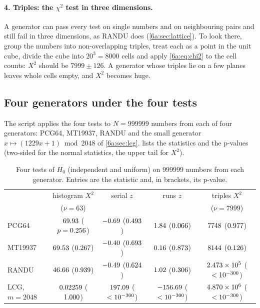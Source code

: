 \paragraph{4. Triples: the $\chi^2$ test in three dimensions.}
A generator can pass every test on single numbers and on neighbouring pairs and
still fail in three dimensions, as RANDU does (\cref{6a:sec:lattice}). To look
there, group the numbers into non-overlapping triples, treat each as a point in
the unit cube, divide the cube into $20^3=8000$ cells and apply \eqref{6a:eq:chi2} to the
cell counts: $X^2$ should be $7999\pm126$. A generator whose triples lie on a few
planes leaves whole cells empty, and $X^2$ becomes huge.

\subsection{Four generators under the four tests}

The script  applies the four tests to $N=999999$
numbers from each of four generators: PCG64, MT19937, RANDU and the small
generator $x\mapsto(1229x+1)\bmod2048$ of \cref{6a:sec:lcg}.
 lists the statistics and the p-values (two-sided for the
normal statistics, the upper tail for $X^2$).

\begin{table}[htbp]
\centering
\small
\renewcommand{\arraystretch}{1.15}
\begin{tabular}{@{}lcccc@{}}
\toprule
 & histogram $X^2$ & serial $z$ & runs $z$ & triples $X^2$\\
 & ($\nu=63$) & & & ($\nu=7999$)\\\midrule
PCG64   & $69.93$ ($p=0.256$) & $-0.69$ ($0.493$) & $1.84$ ($0.066$) & $7748$ ($0.977$)\\
MT19937 & $69.53$ ($0.267$) & $-0.40$ ($0.693$) & $0.16$ ($0.873$) & $8144$ ($0.126$)\\
RANDU   & $46.66$ ($0.939$) & $-0.49$ ($0.624$) & $1.02$ ($0.306$) & $2.473\times10^{5}$ ($<10^{-300}$)\\
LCG, $m=2048$ & $0.02259$ ($1.000$) & $197.09$ ($<10^{-300}$) & $-156.69$ ($<10^{-300}$) & $4.870\times10^{6}$ ($<10^{-300}$)\\
\bottomrule
\end{tabular}
\caption{Four tests of $H_0$ (independent and uniform) on $999999$ numbers from
each generator. Entries are the statistic and, in brackets, its p-value.}
\label{6a:tab:tests}
\end{table}

